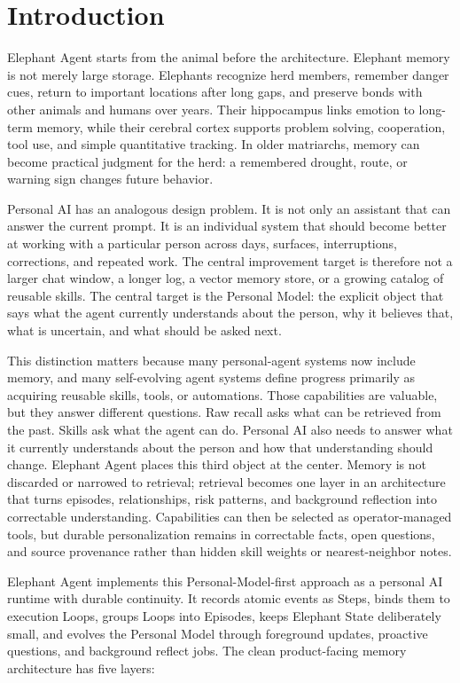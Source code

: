\section{Introduction}
\label{sec:introduction}

Elephant Agent starts from the animal before the architecture. Elephant memory
is not merely large storage. Elephants recognize herd members, remember danger
cues, return to important locations after long gaps, and preserve bonds with
other animals and humans over years. Their hippocampus links emotion to
long-term memory, while their cerebral cortex supports problem solving,
cooperation, tool use, and simple quantitative tracking. In older matriarchs,
memory can become practical judgment for the herd: a remembered drought, route,
or warning sign changes future behavior.

Personal AI has an analogous design problem. It is not only an assistant that
can answer the current prompt. It is an individual system that should become
better at working with a particular person across days, surfaces,
interruptions, corrections, and repeated work. The central improvement target
is therefore not a larger chat window, a longer log, a vector memory store, or
a growing catalog of reusable skills. The central target is the Personal Model:
the explicit object that says what the agent currently understands about the
person, why it believes that, what is uncertain, and what should be asked next.

This distinction matters because many personal-agent systems now include
memory, and many self-evolving agent systems define progress primarily as
acquiring reusable skills, tools, or automations. Those capabilities are
valuable, but they answer different questions. Raw recall asks what can be
retrieved from the past. Skills ask what the agent can do. Personal AI also
needs to answer what it currently understands about the person and how that
understanding should change. Elephant Agent places this third object at the
center. Memory is not discarded or narrowed to retrieval; retrieval becomes one
layer in an architecture that turns episodes, relationships, risk patterns, and
background reflection into correctable understanding. Capabilities can then be
selected as operator-managed tools, but durable personalization remains in
correctable facts, open questions, and source provenance rather than hidden
skill weights or nearest-neighbor notes.

Elephant Agent implements this Personal-Model-first approach as a personal AI runtime
with durable continuity. It records atomic events as Steps, binds them to
execution Loops, groups Loops into Episodes, keeps Elephant State deliberately small,
and evolves the Personal Model through foreground updates, proactive questions,
and background reflect jobs. The clean product-facing memory architecture has
five layers:

